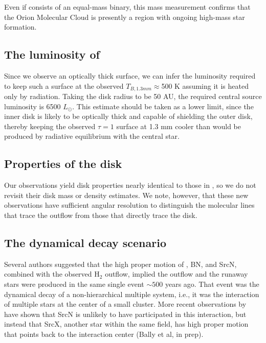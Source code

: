 \documentclass[twocolumn]{aastex61}
\newcommand{\msun}{\ensuremath{M_{\odot}}\xspace}			%
\newcommand{\lsun}{\ensuremath{L_{\odot}}\xspace}			%
\newcommand{\hh}{\ensuremath{\textrm{H}_{2}}\xspace}			%
\newcommand{\sourcen}{SrcN\xspace}
\newcommand{\sourcex}{SrcX\xspace}
\begin{document}
Even if \sourcei consists of an equal-mass binary, this mass measurement
confirms that the Orion Molecular Cloud is presently a region with ongoing
high-mass star formation.

\subsection{The luminosity of \sourcei}
Since we observe an optically thick surface, we can infer the luminosity
required to keep such a surface at the observed $T_{B,1.3 mm}\approx$500 K assuming
it is heated only by radiation.  Taking the disk radius to be 50 AU,
the required central source luminosity is 6500 \lsun.  This estimate
should be taken as a lower limit, since the inner disk is likely to be
optically thick and capable of shielding the outer disk, thereby
keeping the observed $\tau=1$ surface at 1.3 mm cooler than would
be produced by radiative equilibrium with the central star.

\subsection{Properties of the disk}
Our observations yield disk properties nearly identical to those in
\citet{Plambeck2016a}, so we do not revisit their disk mass or density
estimates.  We note, however, that these new observations have sufficient
angular resolution to distinguish the molecular lines that trace the outflow
from those that directly trace the disk.

\subsection{The dynamical decay scenario}
Several authors \citep[][]{Gomez2008a,Goddi2011b,Bally2011a} suggested that
the high proper
motion of \sourcei, BN, and \sourcen, combined with the observed \hh outflow,
implied the outflow and the runaway stars were produced in the same single
event $\sim500$ years ago.  That event was the dynamical decay of a
non-hierarchical multiple system, i.e., it was the interaction of multiple
stars at the center of a small cluster.  More recent observations by
\citet{Luhman2017a} have shown that \sourcen is unlikely to have participated
in this interaction, but instead that \sourcex, another star within the same
field, has high proper motion that points back to the interaction center (Bally et al,
in prep).
\end{document}
